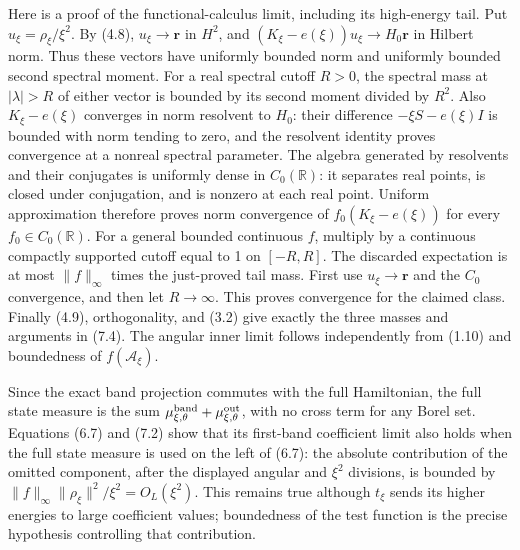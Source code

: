 \documentclass[
  11pt,
]{article}
\begin{document}
Here is a proof of the functional-calculus limit, including its
high-energy tail. Put \(u_\xi=\rho_\xi/\xi^2\). By (4.8),
\(u_\xi\to\mathbf r\) in \(H^2\), and
\((K_\xi-e(\xi))u_\xi\to H_0\mathbf r\) in Hilbert norm. Thus these
vectors have uniformly bounded norm and uniformly bounded second
spectral moment. For a real spectral cutoff \(R>0\), the spectral mass
at \(|\lambda|>R\) of either vector is bounded by its second moment
divided by \(R^2\). Also \(K_\xi-e(\xi)\) converges in norm resolvent to
\(H_0\): their difference \(-\xi S-e(\xi)I\) is bounded with norm
tending to zero, and the resolvent identity proves convergence at a
nonreal spectral parameter. The algebra generated by resolvents and
their conjugates is uniformly dense in \(C_0(\mathbb R)\): it separates
real points, is closed under conjugation, and is nonzero at each real
point. Uniform approximation therefore proves norm convergence of
\(f_0(K_\xi-e(\xi))\) for every \(f_0\in C_0(\mathbb R)\). For a general
bounded continuous \(f\), multiply by a continuous compactly supported
cutoff equal to 1 on \([-R,R]\). The discarded expectation is at most
\(\|f\|_\infty\) times the just-proved tail mass. First use
\(u_\xi\to\mathbf r\) and the \(C_0\) convergence, and then let
\(R\to\infty\). This proves convergence for the claimed class. Finally
(4.9), orthogonality, and (3.2) give exactly the three masses and
arguments in (7.4). The angular inner limit follows independently from
(1.10) and boundedness of \(f(\mathscr A_\xi)\).

Since the exact band projection commutes with the full Hamiltonian, the
full state measure is the sum
\(\mu^{\rm band}_{\xi,\theta}+\mu^{\rm out}_{\xi,\theta}\), with no
cross term for any Borel set. Equations (6.7) and (7.2) show that its
first-band coefficient limit also holds when the full state measure is
used on the left of (6.7): the absolute contribution of the omitted
component, after the displayed angular and \(\xi^2\) divisions, is
bounded by \(\|f\|_\infty\|\rho_\xi\|^2/\xi^2=O_L(\xi^2)\). This remains
true although \(t_\xi\) sends its higher energies to large coefficient
values; boundedness of the test function is the precise hypothesis
controlling that contribution.
\end{document}
